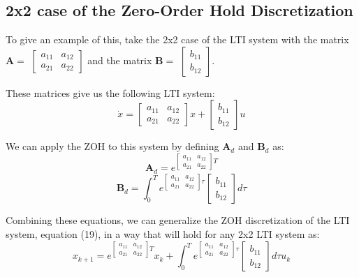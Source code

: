 \documentclass{article}
\begin{document}
\subsection{2x2 case of the Zero-Order Hold Discretization}
To give an example of this, take the 2x2 case of the LTI system with the matrix $\bm{A}=$
$\begin{bmatrix}
    a_{11} & a_{12} \\
    a_{21} & a_{22}
\end{bmatrix}$
and the matrix $\bm{B}=$
$\begin{bmatrix}
    b_{11} \\
    b_{12}
\end{bmatrix}$.

These matrices give us the following LTI system:
\begin{equation}
    \dot{x}=
    \begin{bmatrix}
    a_{11} & a_{12} \\
    a_{21} & a_{22}
    \end{bmatrix}x+
    \begin{bmatrix}
    b_{11} \\
    b_{12}
    \end{bmatrix}u
\end{equation}

We can apply the ZOH to this system by defining $\bm{A}_d$ and $\bm{B}_d$ as:
\begin{equation}
    \bm{A}_d=e^{
    \begin{bmatrix}
    a_{11} & a_{12} \\
    a_{21} & a_{22}
    \end{bmatrix}T}
\end{equation}
\begin{equation}
    \bm{B}_d=\int_{0}^{T}e^{
    \begin{bmatrix}
    a_{11} & a_{12} \\
    a_{21} & a_{22}
    \end{bmatrix}\tau}
    \begin{bmatrix}
    b_{11} \\
    b_{12}
    \end{bmatrix}d\tau
\end{equation}


Combining these equations, we can generalize the ZOH discretization of the LTI system, equation (19), in a way that will hold for any 2x2 LTI system as:
\begin{equation}
    x_{k+1}=e^{
    \begin{bmatrix}
    a_{11} & a_{12} \\
    a_{21} & a_{22}
    \end{bmatrix}T}x_k+\int_{0}^{T}e^{
    \begin{bmatrix}
    a_{11} & a_{12} \\
    a_{21} & a_{22}
    \end{bmatrix}\tau}
    \begin{bmatrix}
    b_{11} \\
    b_{12}
    \end{bmatrix}d\tau u_k
\end{equation}
\end{document}
